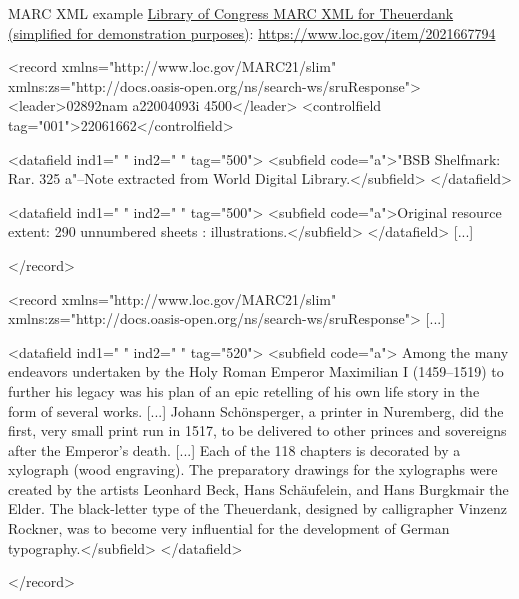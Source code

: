 \begin{frame}{MARC XML example}
    \footnotesize
    \href{https://lccn.loc.gov/2021667794/marcxml }{Library of Congress MARC XML for Theuerdank (simplified for demonstration purposes)}: \protect\url{https://www.loc.gov/item/2021667794}

    \begin{xmlcode}
<record xmlns="http://www.loc.gov/MARC21/slim" 
        xmlns:zs="http://docs.oasis-open.org/ns/search-ws/sruResponse">
    <leader>02892nam a22004093i 4500</leader>
    <controlfield tag="001">22061662</controlfield>

    <datafield ind1=" " ind2=" " tag="500">
      <subfield code="a">"BSB Shelfmark: Rar. 325 a"--Note extracted 
      from World Digital Library.</subfield>
    </datafield>
    
    <datafield ind1=" " ind2=" " tag="500">
      <subfield code="a">Original resource extent: 290 unnumbered 
      sheets : illustrations.</subfield>
    </datafield>
    [...]

</record>
\end{xmlcode}

    \begin{xmlcode}
<record xmlns="http://www.loc.gov/MARC21/slim" 
        xmlns:zs="http://docs.oasis-open.org/ns/search-ws/sruResponse">
        [...]
    
    <datafield ind1=" " ind2=" " tag="520">
      <subfield code="a">
      Among the many endeavors undertaken by the Holy Roman Emperor 
      Maximilian I (1459--1519) to further his legacy was his plan 
      of an epic retelling of his own life story in the form of 
      several works.       
      [...]
      Johann Schönsperger, a printer in Nuremberg, did the first, 
      very small print run in 1517, to be delivered to other princes 
      and sovereigns after the Emperor's death. 
      [...]
      Each of the 118 chapters is decorated by a xylograph 
      (wood engraving). The preparatory drawings for the xylographs 
      were created by the artists Leonhard Beck, 
      Hans Schäufelein, and Hans Burgkmair the Elder. The black-letter 
      type of the Theuerdank, designed by calligrapher Vinzenz Rockner, 
      was to become very influential for the development 
      of German typography.</subfield>
</datafield>

</record>
\end{xmlcode}

\end{frame}



